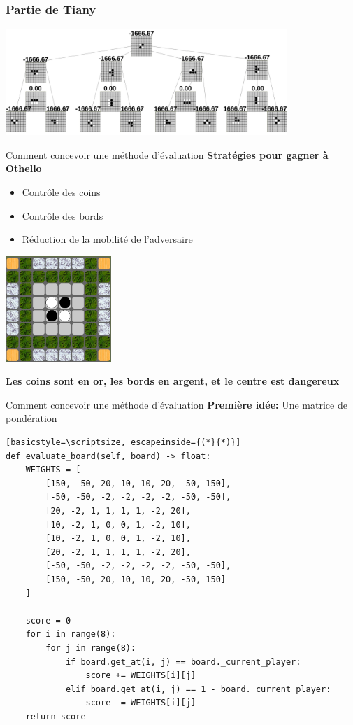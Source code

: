 \begin{frame}
    \frametitle{Partie de Tiany}
    \centering
    \includegraphics[width=0.8\textwidth]{img/minmax_eval.jpg}
\end{frame}

\begin{frame}[t]{Comment concevoir une méthode d'évaluation}
    \textbf{Stratégies pour gagner à Othello}
    \begin{itemize}
        \item Contrôle des coins 
        \item Contrôle des bords 
        \item Réduction de la mobilité de l'adversaire
    \end{itemize}
    \begin{center}
        \includegraphics[width=0.3\textwidth]{img/eval_0.png}
    \end{center}
    \textbf{Les coins sont en or, les bords en argent, et le centre est dangereux}
\end{frame}

\begin{frame}[t,fragile]{Comment concevoir une méthode d'évaluation}
    \textbf{Première idée:}
    Une matrice de pondération
    \begin{lstlisting}[basicstyle=\scriptsize, escapeinside={(*}{*)}]
def evaluate_board(self, board) -> float:
    WEIGHTS = [
        [150, -50, 20, 10, 10, 20, -50, 150],
        [-50, -50, -2, -2, -2, -2, -50, -50],
        [20, -2, 1, 1, 1, 1, -2, 20],
        [10, -2, 1, 0, 0, 1, -2, 10],
        [10, -2, 1, 0, 0, 1, -2, 10],
        [20, -2, 1, 1, 1, 1, -2, 20],
        [-50, -50, -2, -2, -2, -2, -50, -50],
        [150, -50, 20, 10, 10, 20, -50, 150]
    ]
    
    score = 0
    for i in range(8):
        for j in range(8):
            if board.get_at(i, j) == board._current_player:
                score += WEIGHTS[i][j]
            elif board.get_at(i, j) == 1 - board._current_player:
                score -= WEIGHTS[i][j]
    return score
    \end{lstlisting}
\end{frame}
